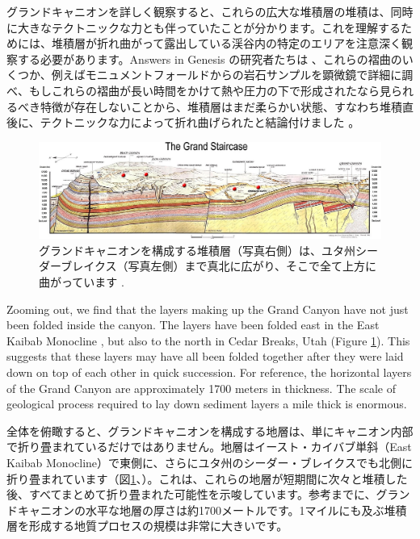 \documentclass[10pt,twocolumn,letterpaper]{article}
\begin{document}
グランドキャニオンを詳しく観察すると、これらの広大な堆積層の堆積は、同時に大きなテクトニックな力とも伴っていたことが分かります。これを理解するためには、堆積層が折れ曲がって露出している渓谷内の特定のエリアを注意深く観察する必要があります。Answers in Genesis の研究者たちは \cite{42}、これらの褶曲のいくつか、例えばモニュメントフォールドからの岩石サンプルを顕微鏡で詳細に調べ、もしこれらの褶曲が長い時間をかけて熱や圧力の下で形成されたなら見られるべき特徴が存在しないことから、堆積層はまだ柔らかい状態、すなわち堆積直後に、テクトニックな力によって折れ曲げられたと結論付けました \cite{43}。

\begin{figure}
\begin{center}
\includegraphics[width=1\textwidth]{Grand_Staircase-big.jpg}
\end{center}
   \caption{グランドキャニオンを構成する堆積層（写真右側）は、ユタ州シーダーブレイクス（写真左側）まで真北に広がり、そこで全て上方に曲がっています \cite{50}.}
\label{fig:4}
\end{figure}
Zooming out, we find that the layers making up the Grand Canyon have not just been folded inside the canyon. The layers have been folded east in the East Kaibab Monocline \cite{46}, but also to the north in Cedar Breaks, Utah (Figure \ref{fig:4}). This suggests that these layers may have all been folded together after they were laid down on top of each other in quick succession. For reference, the horizontal layers of the Grand Canyon are approximately 1700 meters in thickness. The scale of geological process required to lay down sediment layers a mile thick is enormous.

全体を俯瞰すると、グランドキャニオンを構成する地層は、単にキャニオン内部で折り畳まれているだけではありません。地層はイースト・カイバブ単斜（East Kaibab Monocline）で東側に、さらにユタ州のシーダー・ブレイクスでも北側に折り畳まれています（図\ref{fig:4}、\cite{46}）。これは、これらの地層が短期間に次々と堆積した後、すべてまとめて折り畳まれた可能性を示唆しています。参考までに、グランドキャニオンの水平な地層の厚さは約1700メートルです。1マイルにも及ぶ堆積層を形成する地質プロセスの規模は非常に大きいです。
\end{document}
